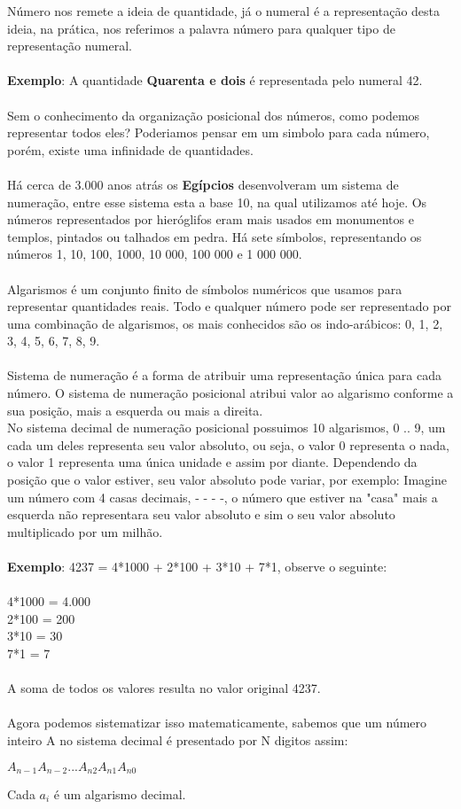 \documentclass[12pt, onecolumn]{article}
\begin{document}
	Número nos remete a ideia de quantidade, já o numeral é a representação desta 
	ideia, na prática, nos referimos a palavra número para qualquer tipo de
	representação numeral.\\
	\\
	\textbf{Exemplo}: A quantidade \textbf{Quarenta e dois} é representada pelo
	numeral 42.\\
	\\
	Sem o conhecimento da organização posicional dos números, como podemos
	representar todos eles? Poderiamos pensar em um simbolo para cada número,
	porém, existe uma infinidade de quantidades.\\
	\\
	Há cerca de 3.000 anos atrás os \textbf{Egípcios} desenvolveram um sistema
	de numeração, entre esse sistema esta a base 10, na qual utilizamos até hoje.
	Os números representados por hieróglifos eram mais usados em monumentos e 
	templos, pintados ou talhados em pedra. 
	Há sete símbolos, representando os números 1, 10, 100, 1000, 10 000, 
	100 000 e 1 000 000.\citep{art3}\\
	\\
	Algarismos é um conjunto finito de símbolos numéricos que usamos para
	representar quantidades reais. Todo e qualquer número pode ser representado
	por uma combinação de algarismos, os mais conhecidos são os indo-arábicos:
	0, 1, 2, 3, 4, 5, 6, 7, 8, 9.\\
	\\
	Sistema de numeração é a forma de atribuir uma representação única para cada
	número. O sistema de numeração posicional atribui valor ao algarismo conforme
	a sua posição, mais a esquerda ou mais a direita.
	\\
	No sistema decimal de numeração posicional possuimos 10 algarismos, 0 .. 9,
	um cada um deles representa seu valor absoluto, ou seja, o valor 0 representa
	o nada, o valor 1 representa uma única unidade e assim por diante. Dependendo
	da posição que o valor estiver, seu valor absoluto pode variar, por exemplo:
	Imagine um número com 4 casas decimais, - - - -, o número que estiver na 
	"casa" mais a esquerda não representara seu valor absoluto e sim o seu valor
	absoluto multiplicado por um milhão.\\
	\\
	\textbf{Exemplo}: 4237 = 4*1000 + 2*100 + 3*10 + 7*1, observe o seguinte:\\
	\\
	4*1000 	= 4.000\\
	2*100 	= 200\\
	3*10	= 30\\
	7*1	= 7\\
	\\
	A soma de todos os valores resulta no valor original 4237.\\
	\\
	Agora podemos sistematizar isso matematicamente, sabemos que um número
	inteiro A no sistema decimal é presentado por N digitos assim:\\
	\begin{center}
		$A_{n-1} A_{n-2} ... A_{n2} A_{n1} A_{n0}$
	\end{center}
	Cada $a_{i}$ é um algarismo decimal.
\end{document}
